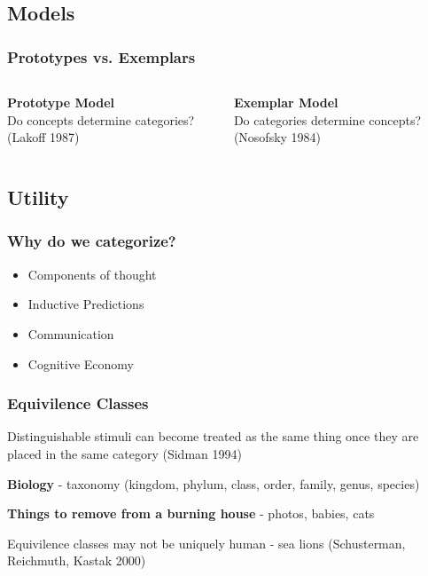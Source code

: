 \documentclass{beamer}
\begin{document}
\subsection{Models}
\begin{frame}
\frametitle{Prototypes vs. Exemplars}
\begin{columns}
\begin{column}{.5\textwidth}
\textbf{Prototype Model}\\
Do concepts determine categories? (Lakoff 1987)
\end{column}
\pause
\begin{column}{.5\textwidth}
\textbf{Exemplar Model}\\
Do categories determine concepts? (Nosofsky 1984)
\end{column}
\end{columns}
\end{frame}

\subsection{Utility}
\begin{frame}
\frametitle{Why do we categorize?}
\begin{itemize}
  \item{Components of thought}
  \pause
  \item{Inductive Predictions}
  \pause
  \item{Communication}
  \pause
  \item{Cognitive Economy}
\end{itemize}
\end{frame}

\begin{frame}
\frametitle{Equivilence Classes}
Distinguishable stimuli can become treated as the same thing once they are placed in the same category (Sidman 1994)\\

\bigskip
\pause

\textbf{Biology} - taxonomy (kingdom, phylum, class, order, family, genus, species)\\

\bigskip
\pause

\textbf{Things to remove from a burning house} - photos, babies, cats\\

\bigskip
\pause

Equivilence classes may not be uniquely human - sea lions (Schusterman, Reichmuth, Kastak 2000)
\end{frame}
\end{document}
